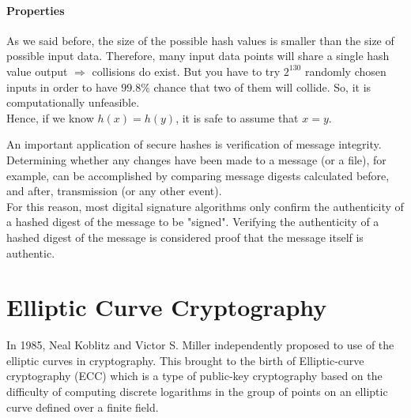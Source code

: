 \paragraph{Properties} 
As we said before, the size of the possible hash values is smaller than the size of possible input data. Therefore, many input data points will share a single hash value output $\Rightarrow$ collisions do exist. But you have to try $2^{130}$ randomly chosen inputs in order to have $99.8 \% $ chance that two of them will collide. So, it is computationally unfeasible.\\
Hence, if we know $h(x) = h(y)$, it is safe to assume that $x= y$.

An important application of secure hashes is verification of message integrity. Determining whether any changes have been made to a message (or a file), for example, can be accomplished by comparing message digests calculated before, and after, transmission (or any other event).\\
For this reason, most digital signature algorithms only confirm the authenticity of a hashed digest of the message to be "signed". Verifying the authenticity of a hashed digest of the message is considered proof that the message itself is authentic.


\section{Elliptic Curve Cryptography}
In 1985, Neal Koblitz and Victor S. Miller independently proposed to use of the elliptic curves in cryptography. This brought to the birth of Elliptic-curve cryptography (ECC) which is a type of public-key cryptography based on the difficulty of computing discrete logarithms in the group of points on an elliptic curve defined over a finite field. 

